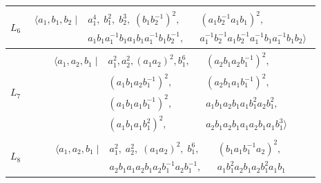 \documentclass[dvipsnames]{article}
\theoremstyle{definition}
\theoremstyle{remark}
\begin{document}
\begin{longtable}{ |c|c| }
    \hline
    $L_6$    
    &
    \begin{minipage}{6cm}
        {
        \vspace{-2.5mm}
        \begin{align*}
            \big \langle
            a_1, b_1, b_2
            \; \big | \;
            &
            a_1^4, \;
            b_1^2, \;
            b_2^3, \; 
            (b_1 b_2^{-1})^2,
            && (a_1 b_2^{-1} a_1 b_1)^2,\\
            & a_1 b_1 a_1^{-1} b_1 a_1 b_1 a_1^{-1} b_1 b_2^{-1},
            && a_1^{-1} b_2^{-1} a_1 b_2^{-1} a_1^{-1} b_1 a_1^{-1} b_1 b_2
            \big \rangle
        \end{align*}
        \vspace{-5mm}
        }
    \end{minipage}\\
    \hline
    $L_7$    
    &
    \begin{minipage}{6cm}
        {
        \vspace{-2.5mm}
        \begin{align*}
            \big \langle
            a_1, a_2, b_1
            \; \big | \;
            &
            a_1^2,
            a_2^2,
            (a_1 a_2)^2,
            b_1^6, 
            && (a_2 b_1 a_2 b_1^{-1})^2,\\
            & (a_1 b_1 a_2 b_1^{-1})^2,
            && (a_2 b_1 a_1 b_1^{-1})^2, \\
            & (a_1 b_1 a_1 b_1^{-1})^2,
            && a_1 b_1 a_2 b_1 a_1 b_1^2 a_2 b_1^2,\\
            & (a_1 b_1 a_1 b_1^2)^2,
            && a_2 b_1 a_2 b_1 a_1 a_2 b_1 a_1 b_1^3
            \big \rangle
        \end{align*}
        \vspace{-5mm}
        }
    \end{minipage}\\
    \hline
    $L_8$    
    &
    \begin{minipage}{6cm}
        {
        \vspace{-2.5mm}
        \begin{align*}
            \big \langle
            a_1, a_2, b_1
            \; \big | \;
            &
            a_1^2, \;
            a_2^2, \; 
            (a_1 a_2)^2, \;
            b_1^6,
            && (b_1 a_1 b_1^{-1} a_2)^2, \\
            & a_2 b_1 a_1 a_2 b_1 a_2 b_1^{-1} a_2 b_1^{-1},
            && a_1 b_1^2 a_2 b_1 a_2 b_1^2 a_1 b_1 

\end{align*}}
\end{minipage}
\end{longtable}
\end{document}
